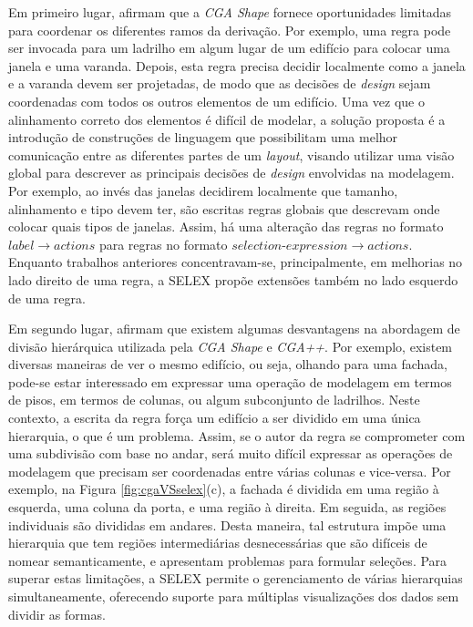 Em primeiro lugar,  afirmam que a \textit{CGA Shape} fornece oportunidades limitadas para coordenar os diferentes ramos da derivação. Por exemplo, uma regra pode ser invocada para um ladrilho em algum lugar de um edifício para colocar uma janela e uma varanda. Depois, esta regra precisa decidir localmente como a janela e a varanda devem ser projetadas, de modo que as decisões de \textit{design} sejam coordenadas com todos os outros elementos de um edifício. Uma vez que o alinhamento correto dos elementos é difícil de modelar, a solução proposta é a introdução de construções de linguagem que possibilitam uma melhor comunicação entre as diferentes partes de um \textit{layout}, visando utilizar uma visão global para descrever as principais decisões de \textit{design} envolvidas na modelagem. Por exemplo, ao invés das janelas decidirem localmente que tamanho, alinhamento e tipo devem ter, são escritas regras globais que descrevam onde colocar quais tipos de janelas. Assim, há uma alteração das regras no formato $label \rightarrow actions$ para regras no formato $selection\mbox{-}expression \rightarrow actions$. Enquanto trabalhos anteriores concentravam-se, principalmente, em melhorias no lado direito de uma regra, a \gls{SELEX} propõe extensões também no lado esquerdo de uma regra.

Em segundo lugar,  afirmam que existem algumas desvantagens na abordagem de divisão hierárquica utilizada pela \textit{CGA Shape} e \textit{CGA++}. Por exemplo, existem diversas maneiras de ver o mesmo edifício, ou seja, olhando para uma fachada, pode-se estar interessado em expressar uma operação de modelagem em termos de pisos, em termos de colunas, ou algum subconjunto de ladrilhos. Neste contexto, a escrita da regra força um edifício a ser dividido em uma única hierarquia, o que é um problema. Assim, se o autor da regra se comprometer com uma subdivisão com base no andar, será muito difícil expressar as operações de modelagem que precisam ser coordenadas entre várias colunas e vice-versa. Por exemplo, na Figura \ref{fig:cgaVSselex}(c), a fachada é dividida em uma região à esquerda, uma coluna da porta, e uma região à direita. Em seguida, as regiões individuais são divididas em andares. Desta maneira, tal estrutura impõe uma hierarquia que tem regiões intermediárias desnecessárias que são difíceis de nomear semanticamente, e apresentam problemas para formular seleções. Para superar estas limitações, a \gls{SELEX} permite o gerenciamento de várias hierarquias simultaneamente, oferecendo suporte para múltiplas visualizações dos dados sem dividir as formas.

